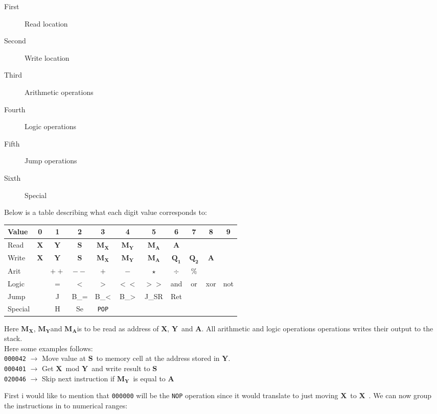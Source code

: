\documentclass{article}
\newcommand{\x}{$\textbf{X}$}
\newcommand{\y}{$\textbf{Y}$}
\newcommand{\s}{$\textbf{S}$}
\newcommand{\A}{$\textbf{A}$}
\newcommand{\mx}{$\textbf{M}_{\textbf{X}}$}
\newcommand{\my}{$\textbf{M}_{\textbf{Y}}$}
\newcommand{\ma}{$\textbf{M}_{\textbf{A}}$}
\newcommand{\q}{$\textbf{Q}_{\textbf{1}}$}
\newcommand{\qq}{$\textbf{Q}_{\textbf{2}}$}
\newcommand{\V}{\verb}
\begin{document}
\begin{description}
  \item[First] Read location
  \item[Second] Write location
  \item[Third] Arithmetic operations
  \item[Fourth] Logic operations
  \item[Fifth] Jump operations
  \item[Sixth] Special
\end{description}
Below is a table describing what each digit value corresponds to:
\begin{center}
\begin{tabular}{l || *{10}{c |}}
Value & 0 & 1 & 2 & 3 & 4 & 5 & 6 & 7 & 8 & 9 \\
\hline
Read & \x & \y & \s  &\mx & \my & \ma & \A & & & \\

Write & \x & \y & \s  &\mx & \my & \ma & \q& \qq & \A &\\

Arit &  & $++$ & $--$ & $+$ & $-$ & $\star$ & $\div$ & \%  &  & \\

Logic &  &  $=$ & $<$ & $>$ & $<<$ & $>>$ & and & or & xor & not\\

Jump & & J & B_{=} & B_{<} & B_{>} & J_{SR} & Ret & & & \\

Special & & H & Se & \V+POP+ &  &  &  &  &  &  \\	
\end{tabular}
\end{center}
Here \mx , \my and \ma is to be read as address of \x , \y \ and \A.  All
arithmetic and logic operations operations writes their output to the stack.\\
Here some examples follows:\\
\verb+000042+ $\rightarrow$ Move value at \s \ to memory cell at the address
stored in \y. \\
\verb+000401+ $\rightarrow$ Get \x \ mod \y \ and write result to \s \\
\verb+020046+ $\rightarrow$ Skip next instruction if \my \ is equal to \A \\
\newpage

First i would like to  mention that
\verb+000000+ will be the \verb+NOP+ operation since it would translate to just
moving \x \ to \x \ . 
We can now group the instructions in to numerical ranges:
\end{document}
